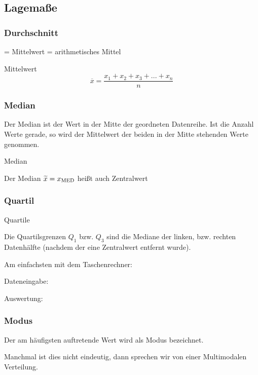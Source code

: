 \begin{multicols}{2}

\subsection{Lagemaße}
\subsubsection{Durchschnitt}
= Mittelwert = arithmetisches Mittel

\begin{definition}{Mittelwert}{}
$$\overline{x} = \frac{x_1 + x_2 + x_3 + ... + x_n}{n}$$
\end{definition}

\subsubsection{Median}
Der Median ist der Wert in der Mitte der geordneten Datenreihe. Ist
die Anzahl Werte gerade, so wird der Mittelwert der beiden in der
Mitte stehenden Werte genommen.
\begin{definition}{Median}{}

Der Median $\widetilde{x} = x_{\textrm{MED}}$ heißt auch Zentralwert
\end{definition}

\subsubsection{Quartil}

\begin{rezept}{Quartile}{}

Die Quartilsgrenzen $Q_1$ bzw. $Q_3$ sind die Mediane der linken,
bzw. rechten Datenhälfte (nachdem der eine Zentralwert entfernt
wurde).

Am einfachsten mit dem Taschenrechner:

Dateneingabe: 

Auswertung: 
\end{rezept}

\subsubsection{Modus}
Der am häufigsten auftretende Wert wird als Modus bezeichnet.

Manchmal ist dies nicht eindeutig, dann sprechen wir von einer
Multimodalen Verteilung.


\end{multicols}
